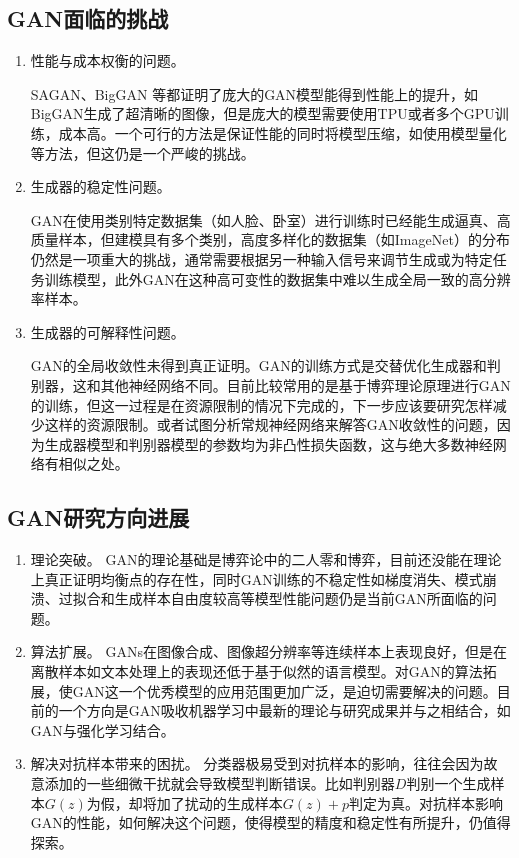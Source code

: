 \documentclass[lang=cn,a4paper,12pt,bibend=biber]{GAN}
\begin{document}
\subsection{GAN面临的挑战}

\begin{enumerate}[挑战 1.]
  \item 性能与成本权衡的问题。

        SAGAN、BigGAN 等都证明了庞大的GAN模型能得到性能上的提升，如BigGAN生成了超清晰的图像，但是庞大的模型需要使用TPU或者多个GPU训练，成本高。一个可行的方法是保证性能的同时将模型压缩，如使用模型量化等方法，但这仍是一个严峻的挑战。

  \item 生成器的稳定性问题。

        GAN在使用类别特定数据集（如人脸、卧室）进行训练时已经能生成逼真、高质量样本，但建模具有多个类别，高度多样化的数据集（如ImageNet）的分布仍然是一项重大的挑战，通常需要根据另一种输入信号来调节生成或为特定任务训练模型，此外GAN在这种高可变性的数据集中难以生成全局一致的高分辨率样本。

  \item 生成器的可解释性问题。

        GAN的全局收敛性未得到真正证明。GAN的训练方式是交替优化生成器和判别器，这和其他神经网络不同。目前比较常用的是基于博弈理论原理进行GAN的训练，但这一过程是在资源限制的情况下完成的，下一步应该要研究怎样减少这样的资源限制。或者试图分析常规神经网络来解答GAN收敛性的问题，因为生成器模型和判别器模型的参数均为非凸性损失函数，这与绝大多数神经网络有相似之处。
\end{enumerate}

\subsection{GAN研究方向进展}

\begin{enumerate}[方向 1.]
  \item 理论突破。
        GAN的理论基础是博弈论中的二人零和博弈，目前还没能在理论上真正证明均衡点的存在性，同时GAN训练的不稳定性如梯度消失、模式崩溃、过拟合和生成样本自由度较高等模型性能问题仍是当前GAN所面临的问题。
  \item 算法扩展。
        GANs在图像合成、图像超分辨率等连续样本上表现良好，但是在离散样本如文本处理上的表现还低于基于似然的语言模型。对GAN的算法拓展，使GAN这一个优秀模型的应用范围更加广泛，是迫切需要解决的问题。目前的一个方向是GAN吸收机器学习中最新的理论与研究成果并与之相结合，如GAN与强化学习结合。
  \item 解决对抗样本带来的困扰。
        分类器极易受到对抗样本的影响，往往会因为故意添加的一些细微干扰就会导致模型判断错误。比如判别器$D$判别一个生成样本$G(z)$为假，却将加了扰动的生成样本$G(z)+p$判定为真。对抗样本影响GAN的性能，如何解决这个问题，使得模型的精度和稳定性有所提升，仍值得探索。
\end{enumerate}
\end{document}
